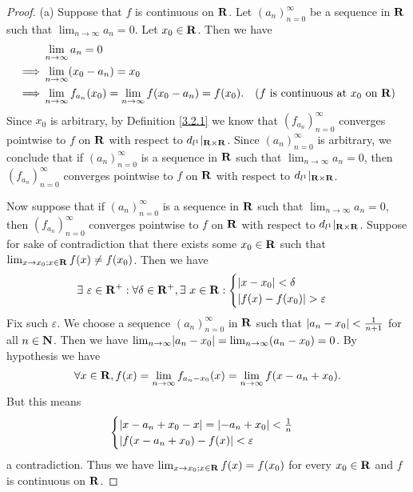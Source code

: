 \begin{proof}{(a)}
    Suppose that \(f\) is continuous on \(\mathbf{R}\).
    Let \((a_n)_{n = 0}^\infty\) be a sequence in \(\mathbf{R}\) such that \(\lim_{n \to \infty} a_n = 0\).
    Let \(x_0 \in \mathbf{R}\).
    Then we have
    \begin{align*}
                 & \lim_{n \to \infty} a_n = 0                                                                                                       \\
        \implies & \lim_{n \to \infty} (x_0 - a_n) = x_0                                                                                             \\
        \implies & \lim_{n \to \infty} f_{a_n}(x_0) = \lim_{n \to \infty} f(x_0 - a_n) = f(x_0). & \text{(\(f\) is continuous at \(x_0\) on \(\mathbf{R}\))}
    \end{align*}
    Since \(x_0\) is arbitrary, by Definition \ref{3.2.1} we know that \((f_{a_n})_{n = 0}^\infty\) converges pointwise to \(f\) on \(\mathbf{R}\) with respect to \(d_{l^1}|_{\mathbf{R} \times \mathbf{R}}\).
    Since \((a_n)_{n = 0}^\infty\) is arbitrary, we conclude that if \((a_n)_{n = 0}^\infty\) is a sequence in \(\mathbf{R}\) such that \(\lim_{n \to \infty} a_n = 0\), then \((f_{a_n})_{n = 0}^\infty\) converges pointwise to \(f\) on \(\mathbf{R}\) with respect to \(d_{l^1}|_{\mathbf{R} \times \mathbf{R}}\).

    Now suppose that if \((a_n)_{n = 0}^\infty\) is a sequence in \(\mathbf{R}\) such that \(\lim_{n \to \infty} a_n = 0\), then \((f_{a_n})_{n = 0}^\infty\) converges pointwise to \(f\) on \(\mathbf{R}\) with respect to \(d_{l^1}|_{\mathbf{R} \times \mathbf{R}}\).
    Suppose for sake of contradiction that there exists some \(x_0 \in \mathbf{R}\) such that \(\lim_{x \to x_0 ; x \in \mathbf{R}} f(x) \neq f(x_0)\).
    Then we have
    \[
        \exists\ \varepsilon \in \mathbf{R}^+ : \forall \delta \in \mathbf{R}^+, \exists\ x \in \mathbf{R} : \begin{cases}
            \left\lvert x - x_0\right\rvert < \delta \\
            \left\lvert f(x) - f(x_0)\right\rvert > \varepsilon
        \end{cases}
    \]
    Fix such \(\varepsilon\).
    We choose a sequence \((a_n)_{n = 0}^\infty\) in \(\mathbf{R}\) such that \(\left\lvert a_n - x_0\right\rvert < \frac{1}{n + 1}\) for all \(n \in \mathbf{N}\).
    Then we have \(\lim_{n \to \infty} \abs{a_n - x_0} = \lim_{n \to \infty} (a_n - x_0) = 0\).
    By hypothesis we have
    \[
        \forall x \in \mathbf{R}, f(x) = \lim_{n \to \infty} f_{a_n - x_0}(x) = \lim_{n \to \infty} f(x - a_n + x_0).
    \]
    But this means
    \[
        \begin{cases}
            \left\lvert x - a_n + x_0 - x\right\rvert = \left\lvert-a_n + x_0\right\rvert < \frac{1}{n} \\
            \left\lvert f(x - a_n + x_0) - f(x)\right\rvert < \varepsilon
        \end{cases}
    \]
    a contradiction.
    Thus we have \(\lim_{x \to x_0 ; x \in \mathbf{R}} f(x) = f(x_0)\) for every \(x_0 \in \mathbf{R}\) and \(f\) is continuous on \(\mathbf{R}\).
\end{proof}

